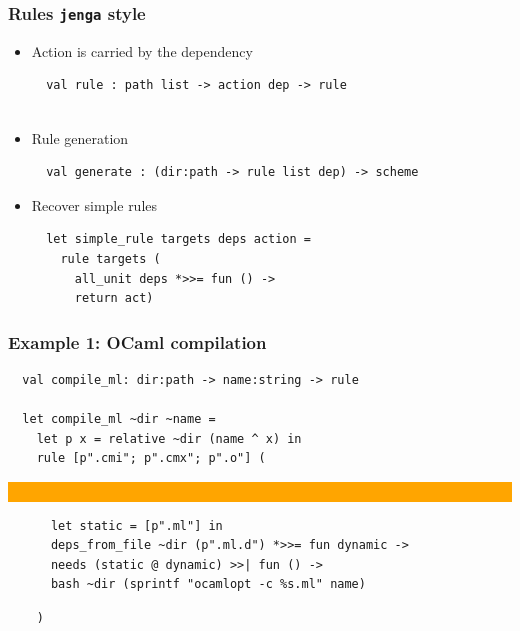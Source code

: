 \documentclass{beamer}
\begin{document}

\begin{frame}[fragile]
\frametitle{Rules {\tt jenga} style}
\begin{itemize}
\item Action is carried by the dependency
{\footnotesize
\begin{verbatim}
  val rule : path list -> action dep -> rule
  
\end{verbatim}}
\item Rule generation
{\footnotesize
\begin{verbatim}
  val generate : (dir:path -> rule list dep) -> scheme

\end{verbatim}}
\item Recover simple rules
{\footnotesize
\begin{verbatim}
  let simple_rule targets deps action =
    rule targets (
      all_unit deps *>>= fun () ->
      return act)
\end{verbatim}}
\end{itemize}
\end{frame}



\begin{frame}[fragile]
\frametitle{Example 1: OCaml compilation}
{\footnotesize
\begin{verbatim}
  val compile_ml: dir:path -> name:string -> rule
  
  let compile_ml ~dir ~name =
    let p x = relative ~dir (name ^ x) in
    rule [p".cmi"; p".cmx"; p".o"] (
\end{verbatim}
\vskip-16pt\hskip18pt
\colorbox{orange}{\parbox[t][2.3cm][t]{8.7cm}{\ }}\vspace*{-2.5cm}
\begin{verbatim}
      let static = [p".ml"] in
      deps_from_file ~dir (p".ml.d") *>>= fun dynamic ->
      needs (static @ dynamic) >>| fun () ->
      bash ~dir (sprintf "ocamlopt -c %s.ml" name)
\end{verbatim}
\begin{verbatim}
    )


\end{verbatim}}
\end{frame}
\end{document}
